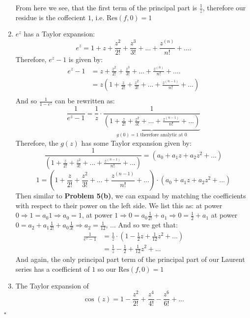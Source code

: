 \documentclass[11pt]{article}
\newenvironment{proof}{\noindent{\bf Proof.}}{\hfill $\square$\medskip}
\begin{document}
\begin{proof}
\begin{enumerate}[label=\textbf{(\alph*)}]
        From here we see, that the first term of the principal part is $\frac{1}{z}$, therefore our residue is the coffecient $1$, i.e. $\text{Res}(f,0)=1$
        \item $e^{z}$ has a Taylor expansion:
        $$e^{z}=1+z+\frac{z^{2}}{2!}+\frac{z^{3}}{3!}+...+\frac{z^{(n)}}{n!}+....$$
        Therefore, $e^{z}-1$ is given by:
        \begin{equation}
            \begin{split}
                e^{z}-1&=z+\frac{z^{2}}{2!}+\frac{z^{3}}{3!}+...+\frac{z^{(n)}}{n!}+....\\
                &=z\left(1+\frac{z}{2!}+\frac{z^{2}}{3!}+...+\frac{z^{(n-1)}}{n!}+...\right)\\
            \end{split}
        \end{equation}
        And so $\frac{1}{1-e^{z}}$ can be rewritten as:
        $$\frac{1}{e^{z}-1}=\frac{1}{z}\cdot\underbrace{\frac{1}{\left(1+\frac{z}{2!}+\frac{z^{2}}{3!}+...+\frac{z^{(n-1)}}{n!}+...\right)}}_\text{$g(0)=1$ therefore analytic at $0$}$$
        Therefore, the $g(z)$ has some Taylor expansion given by:
        $$\frac{1}{\left(1+\frac{z}{2!}+\frac{z^{2}}{3!}+...+\frac{z^{(n-1)}}{n!}+...\right)}=(a_{0}+a_{1}z+a_{2}z^{2}+...)$$
        $$1=\left(1+\frac{z}{2!}+\frac{z^{2}}{3!}+...+\frac{z^{(n-1)}}{n!}+...\right)\cdot(a_{0}+a_{1}z+a_{2}z^{2}+...)$$
        Then similar to \textbf{Problem 5(b)}, we can expand by matching the coefficients with respect to their power on the left side. We list this as: at power $0\Rightarrow 1=a_{0}1\Rightarrow a_{0}=1$, at power $1\Rightarrow 0=a_{0}\frac{1}{2!}+a_{1}\Rightarrow 0=\frac{1}{2}+a_{1}$ at power $0=a_{2}+a_{1}\frac{1}{2!}+a_{0}\frac{1}{3!}\Rightarrow a_{2}=\frac{1}{12}$, ...
        And so we get that:
        \begin{equation}
            \begin{split}
                \frac{1}{e^{z}-1}&=\frac{1}{z}\cdot\left(1-\frac{1}{2}z+\frac{1}{12}z^{2}+...\right)\\
                &=\frac{1}{z}-\frac{1}{2}+\frac{1}{12}z^{2}+...
            \end{split}
        \end{equation}
        And again, the only principal part term of the principal part of our Laurent series has a coefficient of $1$ so our $\text{Res}(f,0)=1$
        \item The Taylor expansion of 
        $$\cos(z)=1-\frac{z^{2}}{2!}+\frac{z^{4}}{4!}-\frac{z^{6}}{6!}+...$$

\end{enumerate}
\end{proof}
\end{document}
